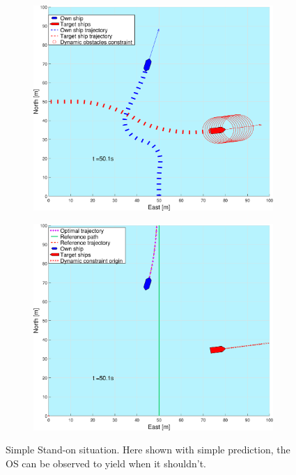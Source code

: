 \begin{figure}[ht!]
\begin{subfigure}[b]{0.499\textwidth}
        \subcaption{}
    \end{subfigure}
    \hfill
    \\
    \begin{subfigure}[b]{0.49\textwidth}
        \centering
        \includegraphics[width=\textwidth]{Images/Figures/enkel_SO/_Simple_1fig1_time=50}
        \subcaption{}
    \end{subfigure}
    \hfill
    \begin{subfigure}[b]{0.499\textwidth}
        \centering
        \includegraphics[width=\textwidth]{Images/Figures/enkel_SO/_Simple_1fig999_time=50}
        \subcaption{}
    \end{subfigure}
    \hfill
    \caption{Simple Stand-on situation. Here shown with simple prediction, the \gls{OS} can be observed to yield when it shouldn't.}
    \label{FIG: Simple SO simple pred}
\end{figure}%
